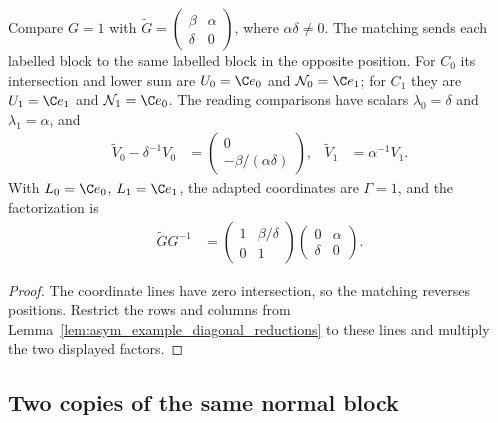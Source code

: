 \begin{lemma}
    \label{lem:asym_example_diagonal_matching}
    \leanok
    Compare $G=1$ with
    $\widetilde G=\left(\begin{smallmatrix}\beta&\alpha\\\delta&0\end{smallmatrix}\right)$,
    where $\alpha\delta\neq0$. The matching sends each labelled block to the
    same labelled block in the opposite position. For $C_0$ its intersection
    and lower sum are $U_0=\C e_0$ and $\mathcal N_0=\C e_1$; for $C_1$ they
    are $U_1=\C e_1$ and $\mathcal N_1=\C e_0$. The reading comparisons have
    scalars $\lambda_0=\delta$ and $\lambda_1=\alpha$, and
    \begin{align}
        \widetilde V_0-\delta^{-1}V_0
                       & =\begin{pmatrix}0\\-\beta/(\alpha\delta)\end{pmatrix}, &
        \widetilde V_1 & =\alpha^{-1}V_1.
    \end{align}
    With $L_0=\C e_0$, $L_1=\C e_1$, the adapted coordinates are $\Gamma=1$,
    and the factorization is
    \begin{align}
        \widetilde G G^{-1}
         & =\begin{pmatrix}1&\beta/\delta\\0&1\end{pmatrix}
        \begin{pmatrix}0&\alpha\\\delta&0\end{pmatrix}.
    \end{align}
\end{lemma}

\begin{proof}
    \leanok
    The coordinate lines have zero intersection, so the matching reverses
    positions. Restrict the rows and columns from
    Lemma~\ref{lem:asym_example_diagonal_reductions} to these lines and multiply
    the two displayed factors.
\end{proof}

\subsection{Two copies of the same normal block}

